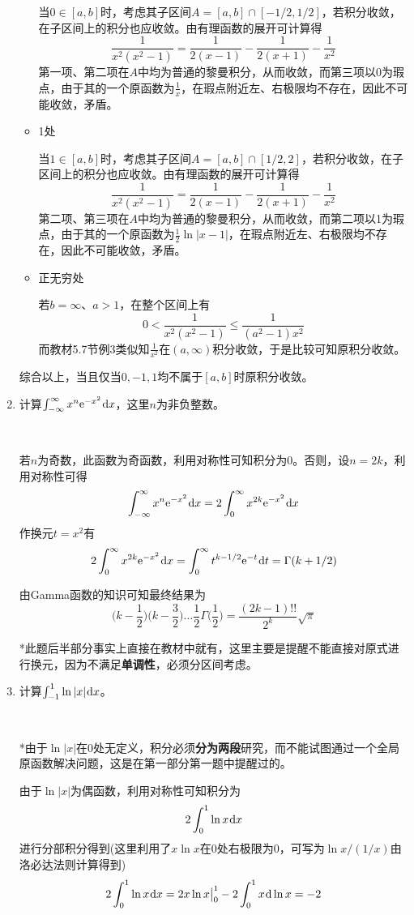 \documentclass[a4paper,UTF8,fontset=windows]{ctexart}
\newcommand*{\dr}{\hspace{0.07em}\mathrm{d}}
\newcommand*{\er}{\mathrm{e}}
\begin{document}
\begin{enumerate}
\begin{itemize}
        当$0\in[a,b]$时，考虑其子区间$A=[a,b]\cap[-1/2,1/2]$，若积分收敛，在子区间上的积分也应收敛。由有理函数的展开可计算得
        $$\frac{1}{x^2(x^2-1)}=\frac{1}{2(x-1)}-\frac{1}{2(x+1)}-\frac{1}{x^2}$$
        第一项、第二项在$A$中均为普通的黎曼积分，从而收敛，而第三项以0为瑕点，由于其的一个原函数为$\frac{1}{x}$，在瑕点附近左、右极限均不存在，因此不可能收敛，矛盾。
        
        \item 1处
        
        当$1\in[a,b]$时，考虑其子区间$A=[a,b]\cap[1/2,2]$，若积分收敛，在子区间上的积分也应收敛。由有理函数的展开可计算得
        $$\frac{1}{x^2(x^2-1)}=\frac{1}{2(x-1)}-\frac{1}{2(x+1)}-\frac{1}{x^2}$$
        第二项、第三项在$A$中均为普通的黎曼积分，从而收敛，而第二项以1为瑕点，由于其的一个原函数为$\frac{1}{2}\ln|x-1|$，在瑕点附近左、右极限均不存在，因此不可能收敛，矛盾。

        \item 正无穷处
        
        若$b=\infty$、$a>1$，在整个区间上有
        $$0<\frac{1}{x^2(x^2-1)}\le\frac{1}{(a^2-1)x^2}$$
        而教材5.7节例3类似知$\frac{1}{x^2}$在$(a,\infty)$积分收敛，于是比较可知原积分收敛。
    \end{itemize}

    综合以上，当且仅当$0,-1,1$均不属于$[a,b]$时原积分收敛。

    \item 计算$\int_{-\infty}^\infty x^n\er^{-x^2}\dr x$，这里$n$为非负整数。
    
    \

    若$n$为奇数，此函数为奇函数，利用对称性可知积分为0。否则，设$n=2k$，利用对称性可得
    $$\int_{-\infty}^\infty x^n\er^{-x^2}\dr x=2\int_0^\infty x^{2k}\er^{-x^2}\dr x$$
    作换元$t=x^2$有
    $$2\int_0^\infty x^{2k}\er^{-x^2}\dr x=\int_0^\infty t^{k-1/2}\er^{-t}\dr t=\Gamma(k+1/2)$$

    由Gamma函数的知识可知最终结果为
    $$\bigg(k-\frac{1}{2}\bigg)\bigg(k-\frac{3}{2}\bigg)\dots\frac{1}{2}\Gamma\bigg(\frac{1}{2}\bigg)=\frac{(2k-1)!!}{2^k}\sqrt\pi$$

    *此题后半部分事实上直接在教材中就有，这里主要是提醒不能直接对原式进行换元，因为不满足\textbf{单调性}，必须分区间考虑。
    
    \item 计算$\int_{-1}^1\ln|x|\dr x$。
    
    \
    
    *由于$\ln|x|$在0处无定义，积分必须\textbf{分为两段}研究，而不能试图通过一个全局原函数解决问题，这是在第一部分第一题中提醒过的。

    由于$\ln|x|$为偶函数，利用对称性可知积分为
    $$2\int_0^1\ln x\dr x$$
    进行分部积分得到(这里利用了$x\ln x$在0处右极限为0，可写为$\ln x/(1/x)$由洛必达法则计算得到)
    $$2\int_0^1\ln x\dr x=2x\ln x\big|^1_0-2\int_0^1x\dr\ln x=-2$$

    
\end{enumerate}
\end{document}
